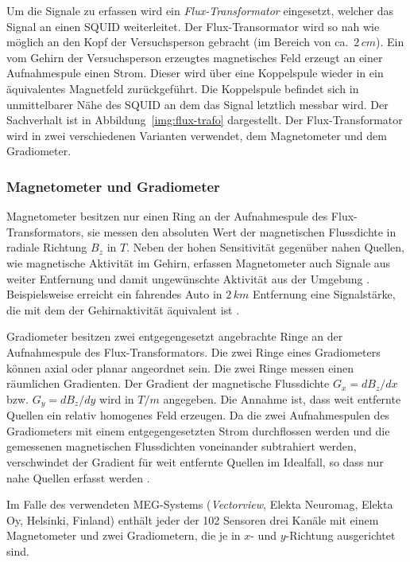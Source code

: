 \documentclass[doc,a4paper,12pt]{apa6}
\begin{document}
Um die Signale zu erfassen wird ein \emph{Flux-Transformator} eingesetzt, welcher das Signal an einen SQUID weiterleitet. Der Flux-Transormator wird so nah wie möglich an den Kopf der Versuchsperson gebracht (im Bereich von ca.~$2\,cm$). Ein vom Gehirn der Versuchsperson erzeugtes magnetisches Feld erzeugt an einer Aufnahmespule einen Strom. Dieser wird über eine Koppelspule wieder in ein äquivalentes Magnetfeld zurückgeführt. Die Koppelspule befindet sich in unmittelbarer Nähe des SQUID an dem das Signal letztlich messbar wird. Der Sachverhalt ist in Abbildung~\ref{img:flux-trafo} dargestellt. Der Flux-Transformator wird in zwei verschiedenen Varianten verwendet, dem Magnetometer und dem Gradiometer.

\subsubsection{Magnetometer und Gradiometer}

Magnetometer besitzen nur einen Ring an der Aufnahmespule des Flux-Transformators, sie messen den absoluten Wert der magnetischen Flussdichte in radiale Richtung $B_z$ in $T$. Neben der hohen Sensitivität gegenüber nahen Quellen, wie magnetische Aktivität im Gehirn, erfassen Magnetometer auch Signale aus weiter Entfernung und damit ungewünschte Aktivität aus der Umgebung \parencite{hansen2010meg}. Beispielsweise erreicht ein fahrendes Auto in $2\,km$ Entfernung eine Signalstärke, die mit dem der Gehirnaktivität äquivalent ist \parencite{weinstock2012squid}.

Gradiometer besitzen zwei entgegengesetzt angebrachte Ringe an der Aufnahmespule des Flux-Transformators. Die zwei Ringe eines Gradiometers können axial oder planar angeordnet sein. Die zwei Ringe messen einen räumlichen Gradienten. Der Gradient der magnetische Flussdichte $G_x = dB_z/dx$ bzw. $G_y = dB_z/dy$ wird in $T/m$ angegeben. Die Annahme ist, dass weit entfernte Quellen ein relativ homogenes Feld erzeugen. Da die zwei Aufnahmespulen des Gradiometers mit einem entgegengesetzten Strom durchflossen werden und die gemessenen magnetischen Flussdichten voneinander subtrahiert werden, verschwindet der Gradient für weit entfernte Quellen im Idealfall, so dass nur nahe Quellen erfasst werden \parencite{hansen2010meg}.

Im Falle des verwendeten MEG-Systems (\emph{Vectorview}, Elekta Neuromag, Elekta Oy, Helsinki, Finland) enthält jeder der 102 Sensoren drei Kanäle mit einem Magnetometer und zwei Gradiometern, die je in $x$- und $y$-Richtung ausgerichtet sind.
\end{document}
